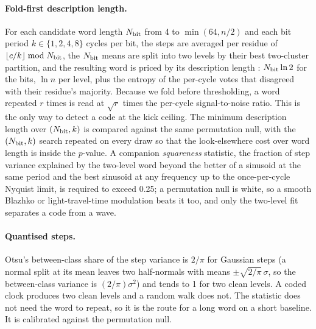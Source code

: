 \documentclass[final,5p]{elsarticle}
\begin{document}
\paragraph{Fold-first description length.} For each candidate word length $N_{\rm bit}$ from 4 to $\min(64, n/2)$ and each bit period $k\in\{1,2,4,8\}$ cycles per bit, the steps are averaged per residue of $\lfloor c/k\rfloor \bmod N_{\rm bit}$, the $N_{\rm bit}$ means are split into two levels by their best two-cluster partition, and the resulting word is priced by its description length \citep{Rissanen1978}: $N_{\rm bit}\ln2$ for the bits, $\ln n$ per level, plus the entropy of the per-cycle votes that disagreed with their residue's majority. Because we fold before thresholding, a word repeated $r$ times is read at $\sqrt r$ times the per-cycle signal-to-noise ratio. This is the only way to detect a code at the kick ceiling. The minimum description length over $(N_{\rm bit},k)$ is compared against the same permutation null, with the $(N_{\rm bit},k)$ search repeated on every draw so that the look-elsewhere cost over word length is inside the $p$-value. A companion \emph{squareness} statistic, the fraction of step variance explained by the two-level word beyond the better of a sinusoid at the same period and the best sinusoid at any frequency up to the once-per-cycle Nyquist limit, is required to exceed 0.25; a permutation null is white, so a smooth Blazhko or light-travel-time modulation beats it too, and only the two-level fit separates a code from a wave.

\paragraph{Quantised steps.} Otsu's between-class share of the step variance \citep{Otsu1979} is $2/\pi$ for Gaussian steps (a normal split at its mean leaves two half-normals with means $\pm\sqrt{2/\pi}\,\sigma$, so the between-class variance is $(2/\pi)\sigma^2$) and tends to 1 for two clean levels. A coded clock produces two clean levels and a random walk does not. The statistic does not need the word to repeat, so it is the route for a long word on a short baseline. It is calibrated against the permutation null.
\end{document}
